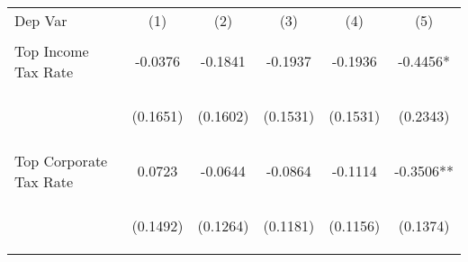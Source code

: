 \begin{center}
\begin{tabular}{lccccc}
\hline \noalign{\smallskip}Dep Var & (1) & (2) & (3) & (4) & (5)\\
\noalign{\smallskip}\hline \noalign{\smallskip}Top Income Tax Rate & \begin{scriptsize}-0.0376\end{scriptsize} & \begin{scriptsize}-0.1841\end{scriptsize} & \begin{scriptsize}-0.1937\end{scriptsize} & \begin{scriptsize}-0.1936\end{scriptsize} & \begin{scriptsize}-0.4456*\end{scriptsize}\\
 & \begin{scriptsize}(0.1651)\end{scriptsize} & \begin{scriptsize}(0.1602)\end{scriptsize} & \begin{scriptsize}(0.1531)\end{scriptsize} & \begin{scriptsize}(0.1531)\end{scriptsize} & \begin{scriptsize}(0.2343)\end{scriptsize}\\
\noalign{\smallskip}Top Corporate Tax Rate & \begin{scriptsize}0.0723\end{scriptsize} & \begin{scriptsize}-0.0644\end{scriptsize} & \begin{scriptsize}-0.0864\end{scriptsize} & \begin{scriptsize}-0.1114\end{scriptsize} & \begin{scriptsize}-0.3506**\end{scriptsize}\\
 & \begin{scriptsize}(0.1492)\end{scriptsize} & \begin{scriptsize}(0.1264)\end{scriptsize} & \begin{scriptsize}(0.1181)\end{scriptsize} & \begin{scriptsize}(0.1156)\end{scriptsize} & \begin{scriptsize}(0.1374)\end{scriptsize}\\

\end{tabular}
\end{center}
